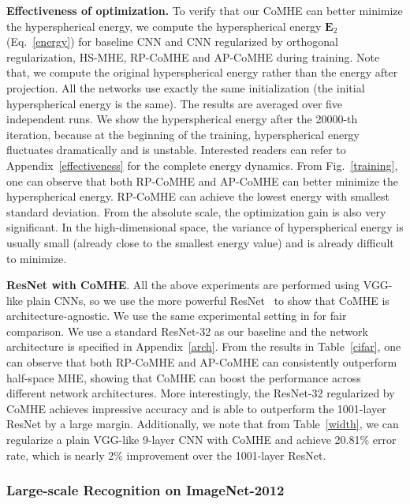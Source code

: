 \par
\textbf{Effectiveness of optimization.} To verify that our CoMHE can better minimize the hyperspherical energy, we compute the hyperspherical energy $\bm{E}_2$ (Eq.~\ref{energy}) for baseline CNN and CNN regularized by orthogonal regularization, HS-MHE, RP-CoMHE and AP-CoMHE during training. Note that, we compute the original hyperspherical energy rather than the energy after projection. All the networks use exactly the same initialization (the initial hyperspherical energy is the same). The results are averaged over five independent runs. We show the hyperspherical energy after the 20000-th iteration, because at the beginning of the training, hyperspherical energy fluctuates dramatically and is unstable. Interested readers can refer to Appendix~\ref{effectiveness} for the complete energy dynamics. From Fig.~\ref{training}, one can observe that both RP-CoMHE and AP-CoMHE can better minimize the hyperspherical energy. RP-CoMHE can achieve the lowest energy with smallest standard deviation. From the absolute scale, the optimization gain is also very significant. In the high-dimensional space, the variance of hyperspherical energy is usually small (already close to the smallest energy value) and is already difficult to minimize.
\par

\textbf{ResNet with CoMHE}. All the above experiments are performed using VGG-like plain CNNs, so we use the more powerful ResNet~\cite{he2015deep} to show that CoMHE is architecture-agnostic. We use the same experimental setting in \cite{he2016identity} for fair comparison. We use a standard ResNet-32 as our baseline and the network architecture is specified in Appendix~\ref{arch}. From the results in Table~\ref{cifar}, one can observe that both RP-CoMHE and AP-CoMHE can consistently outperform half-space MHE, showing that CoMHE can boost the performance across different network architectures. More interestingly, the ResNet-32 regularized by CoMHE achieves impressive accuracy and is able to outperform the 1001-layer ResNet by a large margin. Additionally, we note that from Table~\ref{width}, we can regularize a plain VGG-like 9-layer CNN with CoMHE and achieve 20.81\% error rate, which is nearly 2\% improvement over the 1001-layer ResNet.

\subsubsection{Large-scale Recognition on ImageNet-2012}

